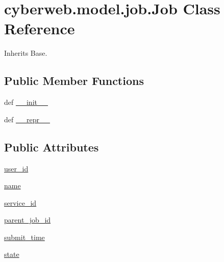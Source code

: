 \hypertarget{classcyberweb_1_1model_1_1job_1_1_job}{\section{cyberweb.\-model.\-job.\-Job \-Class \-Reference}
\label{classcyberweb_1_1model_1_1job_1_1_job}
}


\-Inherits \-Base.

\subsection*{\-Public \-Member \-Functions}
\begin{DoxyCompactItemize}
\item 
def \hyperlink{classcyberweb_1_1model_1_1job_1_1_job_a9c85d9223796ee59c4cf7c1807a1f4af}{\-\_\-\-\_\-init\-\_\-\-\_\-}
\item 
def \hyperlink{classcyberweb_1_1model_1_1job_1_1_job_adbffcdd62fd927e759cfa8e4b4f39c49}{\-\_\-\-\_\-repr\-\_\-\-\_\-}
\end{DoxyCompactItemize}
\subsection*{\-Public \-Attributes}
\begin{DoxyCompactItemize}
\item 
\hyperlink{classcyberweb_1_1model_1_1job_1_1_job_a8f16116c94152d3ba5c71f35fbf80bf4}{user\-\_\-id}
\item 
\hyperlink{classcyberweb_1_1model_1_1job_1_1_job_ae6aef8282dec98dd18da1ed37018532c}{name}
\item 
\hyperlink{classcyberweb_1_1model_1_1job_1_1_job_a61f84cb0b1c42c746485742f5246153c}{service\-\_\-id}
\item 
\hyperlink{classcyberweb_1_1model_1_1job_1_1_job_a1b2c3d9f599a97ce4186579cf60a4a9b}{parent\-\_\-job\-\_\-id}
\item 
\hyperlink{classcyberweb_1_1model_1_1job_1_1_job_ad1d8d29390159b2b69c9805a8fdd0c09}{submit\-\_\-time}
\item 
\hyperlink{classcyberweb_1_1model_1_1job_1_1_job_a6492a839b12044d64a0b094ed4f8dbf5}{state}
\end{DoxyCompactItemize}
